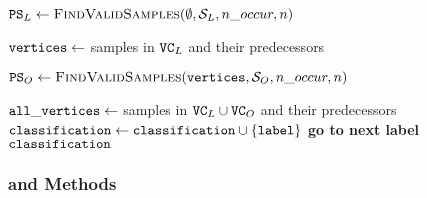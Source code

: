 \begin{algorithm}
\begin{algorithmic}[1]

          \State $\mathtt{PS}_L \gets \textsc{FindValidSamples}(\emptyset, \mathcal{S}_L, n\_occur, n)$

            \State $\mathtt{vertices} \gets $ samples in $\mathtt{VC}_L $ and their predecessors

             \State $\mathtt{PS}_O \gets \textsc{FindValidSamples}(\mathtt{vertices}, \mathcal{S}_O, n\_occur, n)$


                \State $\mathtt{all\_vertices} \gets $ samples in $\mathtt{VC}_L \cup \mathtt{VC}_O$ and their predecessors
                    \State$\mathtt{classification} \gets \mathtt{classification} \cup \{\mathtt{label}\}$
                    \State \textbf{go to next label}
                  \EndIf
              \EndFor
          \EndFor
        \EndFor
      \EndFor
    \EndFor
    \State \Return $\mathtt{classification}$
	\end{algorithmic}
\end{algorithm}

\subsubsection{ and  Methods}

